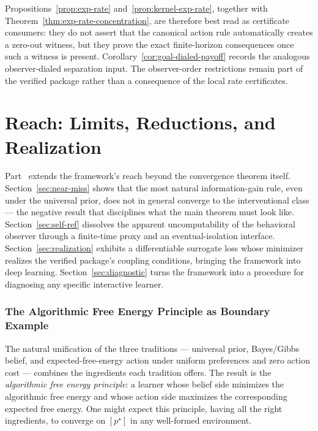 \documentclass[11pt]{article}
\theoremstyle{definition}
\theoremstyle{remark}
\theoremstyle{plain}
\theoremstyle{definition}
\begin{document}
Propositions~\ref{prop:exp-rate} and~\ref{prop:kernel-exp-rate}, together with Theorem~\ref{thm:exp-rate-concentration}, are therefore best read as certificate consumers: they do not assert that the canonical action rule automatically creates a zero-out witness, but they prove the exact finite-horizon consequences once such a witness is present. Corollary~\ref{cor:goal-dialed-payoff} records the analogous observer-dialed separation input. The observer-order restrictions remain part of the verified package rather than a consequence of the local rate certificates.

\part{Reach: Limits, Reductions, and Realization}
\label{part:reach}

Part~\ref{part:reach} extends the framework's reach beyond the convergence theorem itself. Section~\ref{sec:near-miss} shows that the most natural information-gain rule, even under the universal prior, does not in general converge to the interventional class --- the negative result that disciplines what the main theorem must look like. Section~\ref{sec:self-ref} dissolves the apparent uncomputability of the behavioral observer through a finite-time proxy and an eventual-isolation interface. Section~\ref{sec:realization} exhibits a differentiable surrogate loss whose minimizer realizes the verified package's coupling conditions, bringing the framework into deep learning. Section~\ref{sec:diagnostic} turns the framework into a procedure for diagnosing any specific interactive learner.

\section{The Algorithmic Free Energy Principle as Boundary Example}
\label{sec:boundary-example}
\label{sec:near-miss}

The natural unification of the three traditions --- universal prior, Bayes/Gibbs belief, and expected-free-energy action under uniform preferences and zero action cost --- combines the ingredients each tradition offers. The result is the \emph{algorithmic free energy principle}: a learner whose belief side minimizes the algorithmic free energy and whose action side maximizes the corresponding expected free energy. One might expect this principle, having all the right ingredients, to converge on $[p^\star]$ in any well-formed environment.
\end{document}
